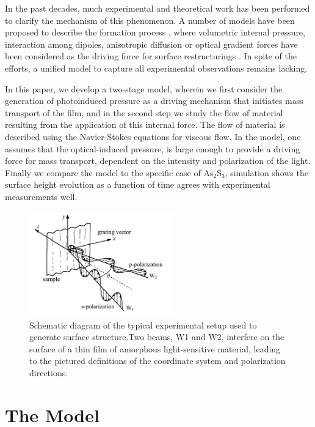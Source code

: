 \documentclass[aps, prl, twocolumn, groupedaddress]{revtex4-1}
\begin{document}
In the past decades, much experimental and theoretical work has been
performed to clarify the mechanism of this phenomenon. A number of
models have been proposed to describe the formation process
\cite{saliminia, hisakuni95}, where volumetric internal pressure,
interaction among dipoles, anisotropic diffusion or optical gradient
forces have been considered as the driving force for surface
restructurings \cite{Kumar:1998je, Bian:1999ic, Lefin:1999fm}. In
spite of the efforts, a unified model to capture all experimental
observations remains lacking.


In this paper, we develop a two-stage model, wherein we first consider
the generation of photoinduced pressure as a driving mechanism that
initiates mass transport of the film, and in the second step we study
the flow of material resulting from the application of this internal
force. The flow of material is described using the Navier-Stokes
equations for viscous flow. In the model, one assumes that the
optical-induced pressure, is large enough to provide a driving force
for mass transport, dependent on the intensity and polarization of the
light. Finally we compare the model to the specific case of
As$_2$S$_3$, simulation shows the surface height evolution as a
function of time agrees with experimental measurements well.

\begin{figure}[!htbp]
  \includegraphics[width=2.45in]{figure/sppic.png}
  \caption{Schematic diagram of the typical experimental setup used to
    generate surface structure.Two beams, W1 and W2, interfere on the
    surface of a thin film of amorphous light-sensitive material, leading
    to the pictured definitions of the coordinate system and polarization directions.}
  \label{fig:setup}
\end{figure}

\section{The Model}
\end{document}

